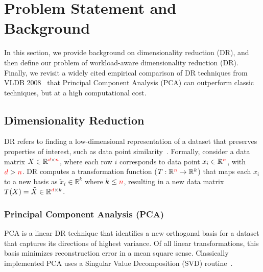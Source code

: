 \section{Problem Statement and Background}
\label{sec:background}

In this section, we  provide background on dimensionality reduction (DR), and then define our problem of workload-aware dimensionality reduction (DR). Finally, we revisit a widely cited empirical comparison of DR techniques from VLDB 2008~\cite{keogh-study}  that Principal Component Analysis (PCA) can outperform classic techniques, but at a high computational cost.

\subsection{Dimensionality Reduction}
\label{sec:defs}

DR refers to finding a low-dimensional representation of a dataset that preserves properties of interest, such as data point similarity~\cite{dr-survey1,dr-survey2}. Formally, consider a data matrix $X \in \mathbb{R}^{{\color{red}d} \times {\color{red}n}}$, where each row $i$ corresponds to data point $x_i \in \mathbb{R}^{\color{red}n}$, with ${\color{red}d} > {\color{red}n}$.  
DR computes a transformation function ($T: \mathbb{R}^{\color{red}n} \rightarrow \mathbb{R}^k$) that maps each $x_i$ to a new basis as $\tilde{x}_i \in \mathbb{R}^k$ where $k \leq {\color{red}n}$, resulting in a new data matrix $T(X) = \tilde{X} \in \mathbb{R}^{{\color{red}d} \times k}$.

\subsubsection*{Principal Component Analysis (PCA)}
\label{sec:pca}
PCA is a linear DR technique that identifies a new orthogonal basis for a dataset that captures its directions of highest variance.
Of all linear transformations, this basis minimizes reconstruction error in a mean square sense. 
Classically implemented PCA uses a Singular Value Decomposition (SVD) routine~\cite{trefethen}.

